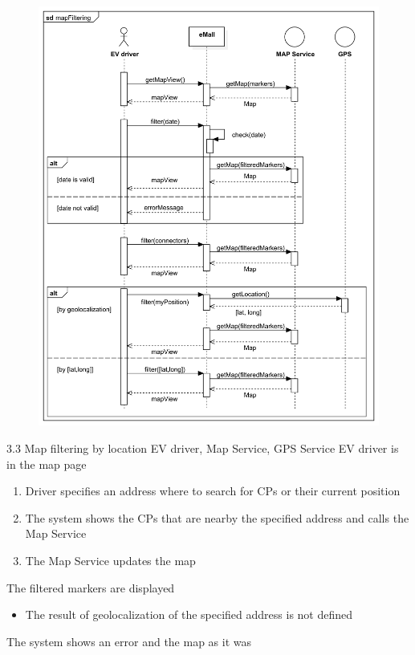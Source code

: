 \usecase
{
    \begin{figure}[H]
        \centering
        \includegraphics[scale=0.9]{src/sequence_diagram/mapFiltering.png}
    \end{figure}
}
{3.3}
{Map filtering by location}
{EV driver, Map Service, GPS Service}
{EV driver is in the map page}
{
    \begin{enumerate}
        \item Driver specifies an address where to search for CPs or their current position
        \item The system shows the CPs that are nearby the specified address and calls the Map Service
        \item The Map Service updates the map
    \end{enumerate}
}
{The filtered markers are displayed}
{
    \begin{itemize}
        \item The result of geolocalization of the specified address is not defined
    \end{itemize}
}
{
    The system shows an error and the map as it was
}

